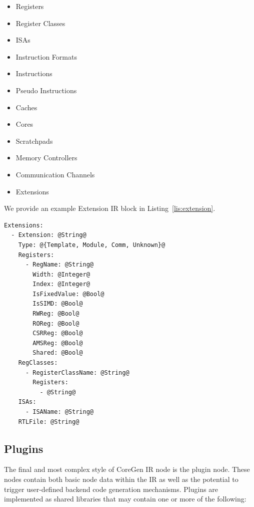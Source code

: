 \documentclass{article}
\begin{document}
\begin{itemize}
\item Registers
\item Register Classes
\item ISAs
\item Instruction Formats
\item Instructions
\item Pseudo Instructions
\item Caches
\item Cores
\item Scratchpads
\item Memory Controllers
\item Communication Channels
\item Extensions
\end{itemize}

We provide an example Extension IR block in Listing~\ref{lis:extension}.  

\clearpage
\vspace{0.125in}
\begin{lstlisting}[frame=single,style=base,caption={Extension Node Definition},captionpos=b,label={lis:extension}]
Extensions:
  - Extension: @String@
    Type: @{Template, Module, Comm, Unknown}@
    Registers:
      - RegName: @String@
        Width: @Integer@
        Index: @Integer@
        IsFixedValue: @Bool@
        IsSIMD: @Bool@
        RWReg: @Bool@
        ROReg: @Bool@
        CSRReg: @Bool@
        AMSReg: @Bool@
        Shared: @Bool@
    RegClasses:
      - RegisterClassName: @String@
        Registers:
          - @String@
    ISAs:
      - ISAName: @String@
    RTLFile: @String@
\end{lstlisting}

\clearpage
\subsection{Plugins}
\label{sec:PluginNodes}

The final and most complex style of CoreGen IR node is the plugin node.  These nodes contain both 
basic node data within the IR as well as the potential to trigger user-defined backend code generation 
mechanisms.  Plugins are implemented as shared libraries that may contain one or more of the following: 
\end{document}
